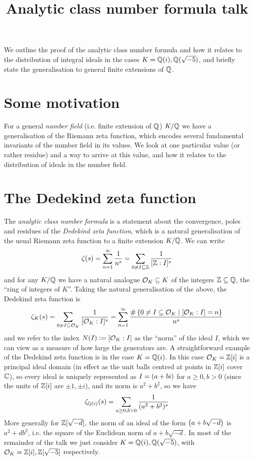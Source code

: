 \documentclass[11pt]{article}
\title{Analytic class number formula talk}
\begin{document}
\maketitle
We outline the proof of the analytic class number formula and how it relates to the distribution of integral ideals in the cases $K = \mathbb{Q}(i), \mathbb{Q}(\sqrt{-5})$, and briefly state the generalisation to general finite extensions of $\mathbb{Q}$.

\section{Some motivation}
For a general \emph{number field} (i.e. finite extension of $\mathbb{Q}$) $K / \mathbb{Q}$ we have a generalisation of the Riemann zeta function, which encodes several fundamental invariants of the number field in its values. We look at one particular value (or rather residue) and a way to arrive at this value, and how it relates to the distribution of ideals in the number field.
\section{The Dedekind zeta function}
The \emph{analytic class number formula} is a statement about the convergence, poles and residues of the \emph{Dedekind zeta function}, which is a natural generalisation of the usual Riemann zeta function to a finite extension $K / \mathbb{Q}$. We can write
$$
    \zeta(s) = \sum_{n = 1}^\infty \frac1{n^s} = \sum_{0 \neq I \subseteq \mathbb{Z}} \frac1{[\mathbb{Z} : I]^s}
$$
and for any $K / \mathbb{Q}$ we have a natural analogue $\mathcal{O}_K \subseteq K$ of the integers $\mathbb{Z} \subseteq \mathbb{Q}$, the ``ring of integers of $K$''. Taking the natural generalisation of the above, the Dedekind zeta function is
$$
    \zeta_K(s) = \sum_{0 \neq I \subseteq \mathcal{O}_K} \frac1{[\mathcal{O}_K : I]^s} = \sum_{n = 1}^\infty \frac{\#\left\{  0 \neq I \subseteq \mathcal{O}_K \mid [\mathcal{O}_K : I] = n  \right\}}{n^s}
$$
and we refer to the index $N(I) \vcentcolon= [\mathcal{O}_K : I]$ as the ``norm'' of the ideal $I$, which we can view as a measure of how large the generators are. A straightforward example of the Dedekind zeta function is in the case $K = \mathbb{Q}(i)$. In this case $\mathcal{O}_K = \mathbb{Z}[i]$ is a principal ideal domain (in effect as the unit balls centred at points in $\mathbb{Z}[i]$ cover $\mathbb{C}$), so every ideal is uniquely represented as $I = \left(  a + bi  \right)$ for $a \geq 0, b > 0$ (since the units of $\mathbb{Z}[i]$ are $\pm 1, \pm i$), and its norm is $a^2 + b^2$, so we have
$$
    \zeta_{\mathbb{Q}(i)}(s) = \sum_{a \geq 0, b > 0} \frac1{(a^2 + b^2)^s}
$$
More generally for $\mathbb{Z}[\sqrt{-d}]$, the norm of an ideal of the form $\left(  a + b\sqrt{-d}  \right)$ is $a^2 + db^2$, i.e. the square of the Euclidean norm of $a + b\sqrt{-d}$. In most of the remainder of the talk we just consider $K = \mathbb{Q}(i), \mathbb{Q}(\sqrt{-5})$, with $\mathcal{O}_K = \mathbb{Z}[i], \mathbb{Z}[\sqrt{-5}]$ respectively.
\end{document}
